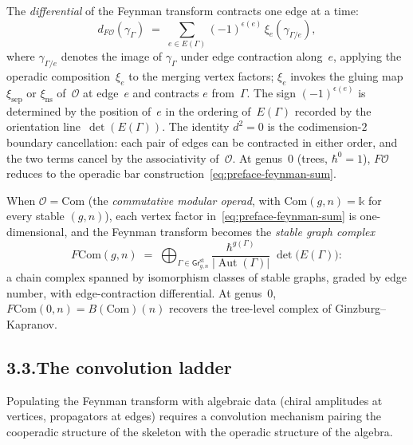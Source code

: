 \documentclass[11pt]{report}
\theoremstyle{definition}
\theoremstyle{remark}
\providecommand{\cO}{\mathcal{O}}
\providecommand{\Com}{\mathrm{Com}}
\providecommand{\Bbbk}{\mathbb{k}}
\numberwithin{equation}{section}
\begin{document}
The \emph{differential} of the Feynman transform contracts one edge at a time:
\[
d_{F\cO}(\gamma_\Gamma)
\;=\;
\sum_{e \in E(\Gamma)}
(-1)^{\epsilon(e)}\,
\xi_e(\gamma_{\Gamma/e}),
\]
where $\gamma_{\Gamma/e}$ denotes the image of $\gamma_\Gamma$
under edge contraction along~$e$, applying the operadic
composition~$\xi_e$ to the merging vertex factors;
$\xi_e$ invokes the gluing map
$\xi_{\mathrm{sep}}$ or $\xi_{\mathrm{ns}}$
of~$\cO$ at edge~$e$ and contracts $e$ from~$\Gamma$.
The sign $(-1)^{\epsilon(e)}$ is determined by the
position of~$e$ in the ordering of~$E(\Gamma)$
recorded by the orientation line~$\det(E(\Gamma))$.
The identity $d^2 = 0$ is the codimension-$2$ boundary
cancellation: each pair of edges can be contracted in
either order, and the two terms cancel by the
associativity of~$\cO$.
At genus~$0$ (trees, $\hbar^0=1$), $F\cO$ reduces
to the operadic bar construction~\eqref{eq:preface-feynman-sum}.

When $\cO=\Com$ (the \emph{commutative modular operad}, with
$\Com(g,n)=\Bbbk$ for every stable $(g,n)$), each
vertex factor in~\eqref{eq:preface-feynman-sum} is
one-dimensional, and the Feynman transform becomes the
\emph{stable graph complex}
\begin{equation}\label{eq:preface-fcom}
F\Com(g,n)
\;=\;
\bigoplus_{\Gamma\in\mathsf{Gr}^{\mathrm{st}}_{g,n}}
\frac{\hbar^{g(\Gamma)}}{|\operatorname{Aut}(\Gamma)|}
\;\det\bigl(E(\Gamma)\bigr):
\end{equation}
a chain complex spanned by isomorphism classes of stable graphs,
graded by edge number, with edge-contraction differential.
At genus~$0$, $F\Com(0,n)=B(\Com)(n)$ recovers the tree-level
complex of Ginzburg--Kapranov.

\subsection*{3.3.\enspace The convolution ladder}

Populating the Feynman transform with algebraic data (chiral
amplitudes at vertices, propagators at edges) requires a
convolution mechanism pairing the cooperadic structure of the
skeleton with the operadic structure of the algebra.
\end{document}
